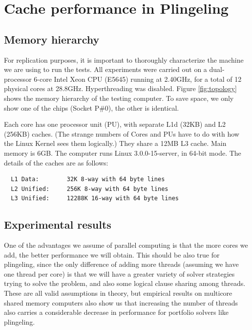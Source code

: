 \documentclass{llncs}
\begin{document}
\section{Cache performance in Plingeling}
\subsection{Memory hierarchy}
\label{sec:memhier}

For replication purposes, it is important to thoroughly characterize
the machine we are using to run the tests. All experiments were
carried out on a dual-processor 6-core Intel Xeon CPU (E5645) running
at 2.40GHz, for a total of 12 physical cores at
28.8GHz. Hyperthreading was disabled. Figure \ref{fig:topology} shows
the memory hierarchy of the testing computer. To save space, we only
show one of the chips (Socket P\#0), the other is identical.


Each core has one processor unit (PU), with separate L1d (32KB) and L2
(256KB) caches. (The strange numbers of Cores and PUs have to do with
how the Linux Kernel sees them logically.) They share a 12MB L3
cache. Main memory is 6GB. The computer runs Linux 3.0.0-15-server, in
64-bit mode. The details of the caches are as follows:

\small
\begin{verbatim}
  L1 Data:        32K 8-way with 64 byte lines
  L2 Unified:     256K 8-way with 64 byte lines
  L3 Unified:     12288K 16-way with 64 byte lines
\end{verbatim}
\normalsize

\subsection{Experimental results}

One of the advantages we assume of parallel computing is that the more
cores we add, the better performance we will obtain. This should be
also true for plingeling, since the only difference of adding more
threads (assuming we have one thread per core) is that we will have a
greater variety of solver strategies trying to solve the problem, and
also some logical clause sharing among threads. These are all valid
assumptions in theory, but empirical results on multicore shared
memory computers also show us that increasing the number of threads
also carries a considerable decrease in performance for portfolio
solvers like plingeling.
\end{document}
